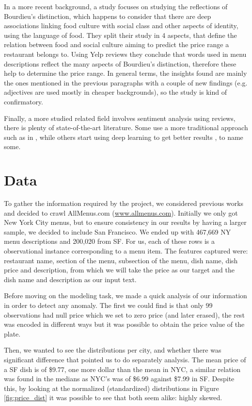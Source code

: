 \documentclass[11pt,letterpaper]{article}
\begin{document}
In a more recent background, a study  \cite{jurafsky2016bordieu} focuses on studying the reflections of Bourdieu's distinction, which happens to consider that there are deep associations linking food culture with social class and other aspects of identity, using the language of food. They split their study in 4 aspects, that define the relation between food and social culture aiming to predict the price range a restaurant belongs to. Using Yelp reviews they conclude that words used in menu descriptions reflect the many aspects of Bourdieu's distinction, therefore these help to determine the price range. In general terms, the insights found are mainly the ones mentioned in the previous paragraphs with a couple of new findings (e.g. adjectives are used mostly in cheaper backgrounds), so the study is kind of confirmatory.

Finally, a more studied related field involves sentiment analysis using reviews, there is plenty of state-of-the-art literature. Some use a more traditional approach such as in \cite{jurafsky2014narrative}, while others start using deep learning to get better results \cite{tang2015document}, to name some.

\section{Data}
To gather the information required by the project, we considered previous works and decided to crawl AllMenus.com (\url{www.allmenus.com}). Initially we only got New York City menus, but to ensure consistency in our results by having a larger sample, we decided to include San Francisco. We ended up with 467,669 NY menu descriptions and 200,020 from SF. For us, each of these rows is a observational instance corresponding to a menu item. The features captured were: restaurant name,  section of the menu, subsection of the menu, dish name, dish price and description, from which we will take the price as our target and the dish name and description as our input text.

Before moving on the modeling task, we made a quick analysis of our information in order to detect any anomaly.  The first we could find is that only 99 observations had null price which we set to zero price (and later erased), the rest was encoded in different ways but it was possible to obtain the price value of the plate. 

Then, we wanted to see the distributions per city, and whether there was significant difference that pointed us to do separately analysis. The mean price of a SF dish is of \$9.77, one more dollar than the mean in NYC, a similar relation was found in the medians as NYC's was of \$6.99 against \$7.99 in SF. Despite this, by looking at the normalized (standardized) distributions in Figure \ref{fig:price_dist} it was possible to see that both seem alike: highly skewed. 
\end{document}
